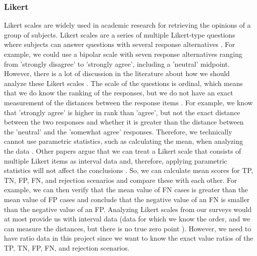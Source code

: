 \subsubsection{Likert}
\label{sec:likert}
Likert scales are widely used in academic research for retrieving the opinions of a group of subjects.
%
Likert scales are a series of multiple Likert-type questions where subjects can answer questions with several response alternatives \cite{boone2012analyzing}.
%
For example, we could use a bipolar scale with seven response alternatives ranging from 'strongly disagree' to 'strongly agree', including a 'neutral' midpoint.
%
However, there is a lot of discussion in the literature about how we should analyze these Likert scales \cite{boone2012analyzing, allen2007likert, norman2010likert, murray2013likert}.
%
The scale of the questions is ordinal, which means that we do know the ranking of the responses, but we do not have an exact measurement of the distances between the response items \cite{allen2007likert}.
%
For example, we know that 'strongly agree' is higher in rank than 'agree', but not the exact distance between the two responses and whether it is greater than the distance between the 'neutral' and the 'somewhat agree' responses.
%
Therefore, we technically cannot use parametric statistics, such as calculating the mean, when analyzing the data \cite{allen2007likert}.
%
Other papers argue that we can treat a Likert scale that consists of multiple Likert items as interval data and, therefore, applying parametric statistics will not affect the conclusions \cite{boone2012analyzing, norman2010likert, murray2013likert}.
%
So, we can calculate mean scores for TP, TN, FP, FN, and rejection scenarios and compare these with each other.
%
For example, we can then verify that the mean value of FN cases is greater than the mean value of FP cases and conclude that the negative value of an FN is smaller than the negative value of an FP.
%
Analyzing Likert scales from our surveys would at most provide us with interval data (data for which we know the order, and we can measure the distances, but there is no true zero point \cite{allen2007likert}).
%
However, we need to have ratio data in this project since we want to know the exact value ratios of the TP, TN, FP, FN, and rejection scenarios.

